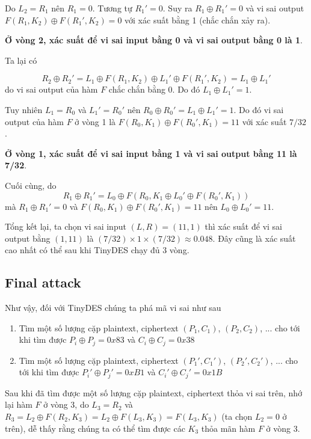 \documentclass{article}
\begin{document}
Do $L_2 = R_1$ nên $R_1 = 0$. Tương tự $R_1' = 0$. Suy ra $R_1 \oplus R_1' = 0$
và vi sai output $F(R_1, K_2) \oplus F(R_1', K_2) = 0$ với xác suất bằng 1 (chắc
chắn xảy ra).

\textbf{Ở vòng 2, xác suất để vi sai input bằng 0 và vi sai output bằng 0 là 1}.

Ta lại có

\[R_2 \oplus R_2' = L_1 \oplus F(R_1, K_2) \oplus L_1' \oplus F(R_1', K_2) = L_1 \oplus L_1'\]
do vi sai output của hàm $F$ chắc chắn bằng 0. Do đó $L_1 \oplus L_1' = 1$.

Tuy nhiên $L_1 = R_0$ và $L_1' = R_0'$ nên $R_0 \oplus R_0' = L_1 \oplus L_1' = 1$.
Do đó vi sai output của hàm $F$ ở vòng 1 là $F(R_0, K_1) \oplus F(R_0', K_1) = 11$ với
xác suất $7/32$.

\textbf{Ở vòng 1, xác suất để vi sai input bằng 1 và vi sai output bằng 11 là 7/32}.

Cuối cùng, do 
\[R_1 \oplus R_1' = L_0 \oplus F(R_0, K_1 \oplus L_0' \oplus F(R_0', K_1))\]
mà $R_1 \oplus R_1' = 0$ và $F(R_0, K_1) \oplus F(R_0', K_1) = 11$ nên 
$L_0 \oplus L_0' = 11$.

Tổng kết lại, ta chọn vi sai input $(L, R) = (11, 1)$ thì xác suất để vi sai output
bằng $(1, 11)$ là $(7/32) \times 1 \times (7/32) \approx 0.048$. Đây cũng là xác suất
cao nhất có thể sau khi TinyDES chạy đủ 3 vòng.

\subsection{Final attack}

Như vậy, đối với TinyDES chúng ta phá mã vi sai như sau

\begin{enumerate}
    \item Tìm một số lượng cặp plaintext, ciphertext $(P_1, C_1)$, $(P_2, C_2)$, ...
    cho tới khi tìm được $P_i \oplus P_j = 0x83$ và $C_i \oplus C_j = 0x38$
    \item Tìm một số lượng cặp plaintext, ciphertext $(P_1', C_1')$, $(P_2', C_2')$, ...
    cho tới khi tìm được $P_i' \oplus P_j' = 0xB1$ và $C_i' \oplus C_j' = 0x1B$
\end{enumerate}

Sau khi đã tìm được một số lượng cặp plaintext, ciphertext thỏa vi sai trên, nhớ
lại hàm $F$ ở vòng 3, do $L_3 = R_2$ và $R_3 = L_2 \oplus F(R_2, K_3) = 
L_2 \oplus F(L_3, K_3) = F(L_3, K_3)$ (ta chọn $L_2 = 0$ ở trên), dễ thấy rằng
chúng ta có thể tìm được các $K_3$ thỏa mãn hàm $F$ ở vòng 3.
\end{document}

